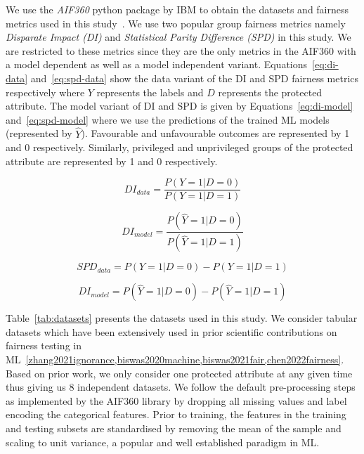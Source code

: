 \documentclass{article}
\begin{document}
We use the \emph{AIF360} python package by IBM to obtain the datasets
and fairness metrics used in this study \cite{bellamy2019ai}. We use
two popular group fairness metrics namely \emph{Disparate Impact (DI)}
and \emph{Statistical Parity Difference (SPD)} in this study. We are
restricted to these metrics since they are the only metrics in the
AIF360 with a model dependent as well as a model independent variant.
Equations \ref{eq:di-data} and \ref{eq:spd-data} show the data variant
of the DI and SPD fairness metrics respectively where $Y$ represents
the labels and $D$ represents the protected attribute. The model
variant of DI and SPD is given by Equations \ref{eq:di-model}
and \ref{eq:spd-model} where we use the predictions of the trained ML
models (represented by $\hat{Y}$). Favourable and unfavourable
outcomes are represented by 1 and 0 respectively. Similarly,
privileged and unprivileged groups of the protected attribute are
represented by 1 and 0 respectively.

\begin{equation}
  DI_{data} = \frac{P(Y=1|D=0)}{P(Y=1|D=1)}
  \label{eq:di-data}
\end{equation}

\begin{equation}
  DI_{model} = \frac{P(\hat{Y}=1|D=0)}{P(\hat{Y}=1|D=1)}
  \label{eq:di-model}
\end{equation}

\begin{equation}
  SPD_{data} = P(Y=1|D=0)-P(Y=1|D=1)
  \label{eq:spd-data}
\end{equation}

\begin{equation}
  DI_{model} = P(\hat{Y}=1|D=0)-P(\hat{Y}=1|D=1)
  \label{eq:spd-model}
\end{equation}

Table \ref{tab:datasets} presents the datasets used in this study. We
consider tabular datasets which have been extensively used in prior
scientific contributions on fairness testing in
ML \ref{zhang2021ignorance,biswas2020machine,biswas2021fair,chen2022fairness}.
Based on prior work, we only consider one protected attribute at any
given time thus giving us 8 independent datasets. We follow the
default pre-processing steps as implemented by the AIF360 library by
dropping all missing values and label encoding the categorical
features. Prior to training, the features in the training and testing
subsets are standardised by removing the mean of the sample and
scaling to unit variance, a popular and well established paradigm in
ML.
\end{document}
